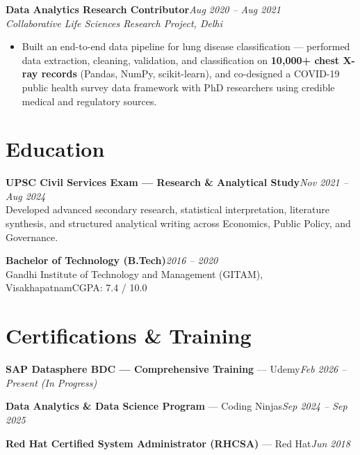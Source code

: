 \documentclass[10pt, letterpaper]{article}
\newcommand{\role}[3]{%
  \vspace{2pt}%
  {\bfseries #1}\hfill{\small\color{muted}\textit{#3}}\\[-2pt]%
  {\small\color{muted}\textit{#2}}%
}
\begin{document}
\vspace{1pt}

\role{Data Analytics Research Contributor}{Collaborative Life Sciences Research Project, Delhi}{Aug 2020 – Aug 2021}

\begin{itemize}
  \item Built an end-to-end data pipeline for lung disease classification — performed data extraction, cleaning, validation, and classification on \textbf{10,000+ chest X-ray records} (Pandas, NumPy, scikit-learn), and co-designed a COVID-19 public health survey data framework with PhD researchers using credible medical and regulatory sources.
\end{itemize}

\section{Education}

{\bfseries UPSC Civil Services Exam — Research \& Analytical Study}\hfill{\small\color{muted}\textit{Nov 2021 – Aug 2024}}\\
{\small\color{muted}Developed advanced secondary research, statistical interpretation, literature synthesis, and structured analytical writing across Economics, Public Policy, and Governance.}

\vspace{2pt}
{\bfseries Bachelor of Technology (B.Tech)}\hfill{\small\color{muted}\textit{2016 – 2020}}\\
{\small\color{muted}Gandhi Institute of Technology and Management (GITAM), Visakhapatnam\hfill CGPA: 7.4 / 10.0}

\section{Certifications \& Training}

{\bfseries SAP Datasphere BDC — Comprehensive Training} — Udemy\hfill{\small\color{muted}\textit{Feb 2026 – Present \emph{(In Progress)}}}

\vspace{1pt}
{\bfseries Data Analytics \& Data Science Program} — Coding Ninjas\hfill{\small\color{muted}\textit{Sep 2024 – Sep 2025}}

\vspace{1pt}
{\bfseries Red Hat Certified System Administrator (RHCSA)} — Red Hat\hfill{\small\color{muted}\textit{Jun 2018}}

\end{document}

